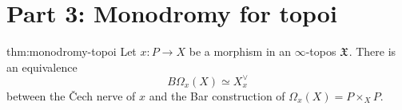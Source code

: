 \newpage
\section{Part 3: Monodromy for topoi}

\begin{theorem}{thm:monodromy-topoi}
Let $x : P \to X$ be a morphism in an $\infty$-topos $\mathfrak{X}$. There is an equivalence
    \[
    B\Omega_x(X) \simeq X^\vee_x
    \]
between the \v{C}ech nerve of $x$ and the Bar construction of $\Omega_x(X) = P \times_X P$. 
\end{theorem}
